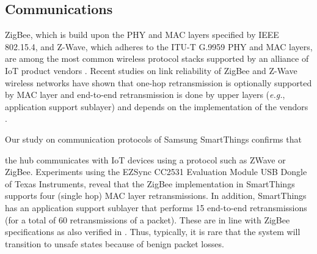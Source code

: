 \subsection{Communications} {\color{black}ZigBee, which is build upon the PHY and MAC layers specified by IEEE 802.15.4, and Z-Wave, which adheres to the ITU-T G.9959 PHY and MAC layers, are among the most common wireless protocol stacks supported by an alliance of IoT product vendors \cite{Samsung:smartthingsproduct,Philips:hue,Yale:assurelock,Ecobee:thermostat}. Recent studies on link reliability of ZigBee and Z-Wave wireless networks have shown that one-hop retransmission is optionally supported by MAC layer and end-to-end retransmission is done by upper layers (\textit{e.g.}, application support sublayer) and depends on the implementation of the vendors \cite{s140814932,5747474,6379462,6392527,FULLER201744,7745306}.

Our study on communication protocols of Samsung SmartThings confirms that} the hub communicates with IoT devices using a protocol such as ZWave or ZigBee.
Experiments using the EZSync CC2531 Evaluation Module USB Dongle \cite{TI:CC2531} of
Texas Instruments, reveal that the ZigBee implementation
in SmartThings supports four (single hop) MAC layer retransmissions.
In addition, SmartThings has an application support sublayer that performs 15
end-to-end retransmissions (for a total of 60 retransmissions of a packet).
These are in line with ZigBee specifications as also verified in
\cite{s140814932,5747474,6379462,6392527}. Thus, typically,
it is rare that the system will transition to unsafe states because
of benign packet losses.


